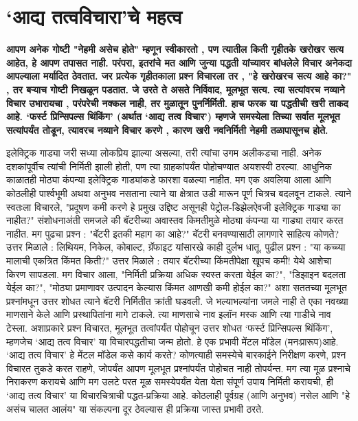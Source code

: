 \chapter{‘आद्य तत्वविचारा’चे महत्व}

\textcolor{blue!60!black}{\textbf{आपण अनेक गोष्टी "नेहमी असेच होते" म्हणून स्वीकारतो , पण त्यातील किती गृहीतके खरोखर सत्य आहेत, हे आपण तपासत नाही. परंपरा, इतरांचे मत आणि जुन्या पद्धती यांच्यावर बांधलेले विचार अनेकदा आपल्याला मर्यादित ठेवतात. जर प्रत्येक गृहीतकाला प्रश्न विचारला तर , "हे खरोखरच सत्य आहे का?" , तर बऱ्याच गोष्टी निखळून पडतात. जे उरते ते असते निर्विवाद, मूलभूत सत्य. त्या सत्यांवरच नव्याने विचार उभारायचा , परंपरेची नक्कल नाही, तर मुळातून पुनर्निर्मिती. हाच फरक या पद्धतीची खरी ताकद आहे. ‘फर्स्ट प्रिन्सिपल्स थिंकिंग’ (अर्थात ‘आद्य तत्व विचार’) म्हणजे समस्येला तिच्या सर्वात मूलभूत सत्यांपर्यंत तोडून, त्यावरच नव्याने विचार करणे , कारण खरी नवनिर्मिती नेहमी तळापासूनच होते.}}

इलेक्ट्रिक गाड्या जरी सध्या लोकप्रिय झाल्या असल्या, तरी त्यांचा उगम अलीकडचा नाही. अनेक दशकांपूर्वीच त्यांची निर्मिती झाली होती, पण त्या ग्राहकांपर्यंत पोहोचण्यात अयशस्वी ठरल्या. आधुनिक काळातही मोठ्या कंपन्या इलेक्ट्रिक गाड्यांकडे फारशा वळल्या नाहीत. मग एक अवलिया आला आणि कोठलीही पार्श्वभूमी अथवा अनुभव नसताना त्याने या क्षेत्रात उडी मारून पूर्ण चित्रच बदलवून टाकले. 
त्याने स्वतःला विचारले, "प्रदूषण कमी करणे हे प्रमुख उद्दिष्ट असूनही पेट्रोल-डिझेलऐवजी इलेक्ट्रिक गाड्या का नाहीत?" संशोधनाअंती समजले की बॅटरीच्या अवास्तव किमतीमुळे मोठ्या कंपन्या या गाड्या तयार करत नाहीत. मग पुढचा प्रश्न :  "बॅटरी इतकी महाग का आहे?" बॅटरी बनवण्यासाठी लागणारे साहित्य कोणते? उत्तर मिळाले : लिथियम, निकेल, कोबाल्ट, ग्रॅफाइट यांसारखे काही दुर्लभ धातू. पुढील प्रश्न : "या कच्च्या मालाची एकत्रित किंमत किती?" उत्तर मिळाले : तयार बॅटरीच्या किंमतीपेक्षा खूपच कमी! येथे आशेचा किरण सापडला. मग विचार आला, "निर्मिती प्रक्रिया अधिक स्वस्त करता येईल का?", "डिझाइन बदलता येईल का?", "मोठ्या प्रमाणावर उत्पादन केल्यास किंमत आणखी कमी होईल का?" अशा सततच्या मूलभूत प्रश्नांमधून उत्तर शोधत त्याने बॅटरी निर्मितीत क्रांती घडवली. जे भल्याभल्यांना जमले नाही ते एका नवख्या माणसाने केले आणि प्रस्थापितांना मागे टाकले. त्या माणसाचे नाव इलॉन मस्क आणि त्या गाडीचे नाव टेस्ला.
अशाप्रकारे  प्रश्न विचारत, मूलभूत तत्वांपर्यंत पोहोचून उत्तर शोधत ‘फर्स्ट प्रिन्सिपल्स थिंकिंग’, म्हणजेच ‘आद्य तत्व विचार’ या विचारपद्धतीचा जन्म होतो. हे एक प्रभावी मेंटल मॉडेल (मनःप्रारूप)आहे. 
‘आद्य तत्व विचार’ हे मेंटल मॉडेल कसे कार्य करते?
कोणत्याही समस्येचे बारकाईने निरीक्षण करणे, प्रश्न विचारत तुकडे करत राहणे, जोपर्यंत आपण मूलभूत प्रश्नांपर्यंत पोहोचत नाही तोपर्यन्त. मग त्या मूळ प्रश्नाचे निराकरण करायचे आणि मग उलटे परत मूळ समस्येपर्यंत येता येता संपूर्ण उपाय निर्मिती करायची, ही ‘आद्य तत्व विचार’ या विचारचित्राची पद्धत-प्रक्रिया आहे. कोठलाही पूर्वग्रह (आणि अनुभव) नसेल आणि "हे असंच चालत आलंय" या संकल्पना दूर ठेवल्यास  ही प्रक्रिया जास्त प्रभावी ठरते. 

